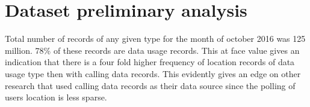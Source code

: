 \documentclass[12pt, a4paper]{report}
\theoremstyle{definition}
\theoremstyle{definition}%
\theoremstyle{definition}%
\theoremstyle{definition}%
\theoremstyle{definition}%
\theoremstyle{definition}%
\begin{document}
\begin{table}[h]
    \label{table:dataset_01}
	\centering
\caption{Data Dictionary of mobile usage raw dataset} 
\end{table}


\section{Dataset preliminary analysis} \label{section:methodology:data_set_preliminary_analysis}

Total number of records of any given type for the month of october 2016 was 125 million. 78\% of these records are data usage records. This at face value gives an indication that there is a four fold higher frequency of location records of data usage type then with calling data records. This evidently gives an edge on other research that used calling data records as their data source since the polling of users location is less sparse.

\end{document}
